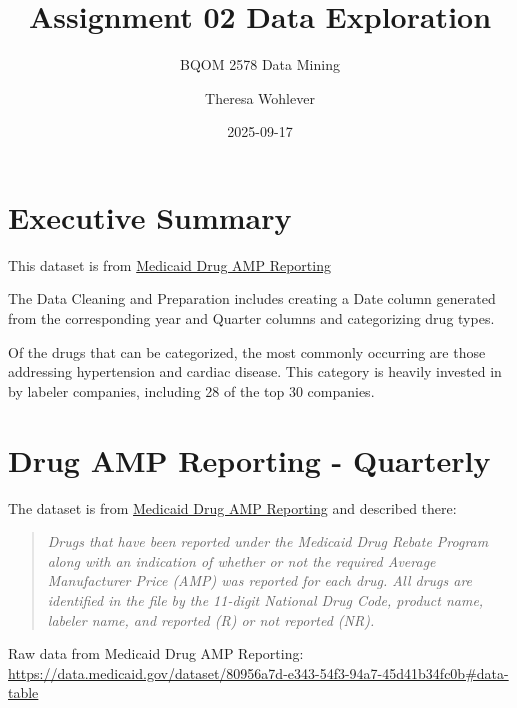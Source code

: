 \documentclass[
  letterpaper,
  DIV=11,
  numbers=noendperiod]{scrartcl}
\title{Assignment 02 Data Exploration}
\subtitle{BQOM 2578 \textbar{} Data Mining}
\author{Theresa Wohlever}
\date{2025-09-17}
\renewcommand*\contentsname{Table of contents}
\newcommand\contentsname{Table of contents}
\begin{document}
\maketitle

\renewcommand*\contentsname{Table of contents}
{
\hypersetup{linkcolor=}
\setcounter{tocdepth}{2}
\tableofcontents
}

\section{Executive Summary}\label{executive-summary}

This dataset is from
\href{https://data.medicaid.gov/dataset/80956a7d-e343-54f3-94a7-45d41b34fc0b\#data-table}{Medicaid
Drug AMP Reporting}

The Data Cleaning and Preparation includes creating a Date column
generated from the corresponding year and Quarter columns and
categorizing drug types.

Of the drugs that can be categorized, the most commonly occurring are
those addressing hypertension and cardiac disease. This category is
heavily invested in by labeler companies, including 28 of the top 30
companies.

\section{Drug AMP Reporting -
Quarterly}\label{drug-amp-reporting---quarterly}

The dataset is from
\href{https://data.medicaid.gov/dataset/80956a7d-e343-54f3-94a7-45d41b34fc0b\#data-table}{Medicaid
Drug AMP Reporting} and described there:

\begin{quote}
\emph{Drugs that have been reported under the Medicaid Drug Rebate
Program along with an indication of whether or not the required Average
Manufacturer Price (AMP) was reported for each drug. All drugs are
identified in the file by the 11-digit National Drug Code, product name,
labeler name, and reported (R) or not reported (NR).}
\end{quote}

Raw data from Medicaid Drug AMP Reporting:
\url{https://data.medicaid.gov/dataset/80956a7d-e343-54f3-94a7-45d41b34fc0b\#data-table}
\end{document}
